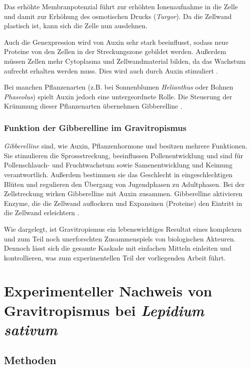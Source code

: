 \documentclass[
a4paper, 
11pt, 
ngerman,
listof=totoc,
bibliography=totocnumbered,
abstracton
]{scrreprt}
\begin{document}
Das erhöhte Membranpotenzial führt zur erhöhten Ionenaufnahme in die Zelle und damit zur Erhöhung des osmotischen Drucks (\emph{Turgor}). Da die Zellwand plastisch ist, kann sich die Zelle nun ausdehnen. 

Auch die Genexpression wird von Auxin sehr stark beeinflusst, sodass neue Proteine von den Zellen in der Streckungszone gebildet werden.
Außerdem müssen Zellen mehr Cytoplasma und Zellwandmaterial bilden, da das Wachstum aufrecht erhalten werden muss. Dies wird auch durch Auxin stimuliert \parencite[1118ff]{campbell}.

Bei manchen Pflanzenarten (z.B. bei Sonnenblumen \emph{Helianthus} oder Bohnen \emph{Phaseolus}) spielt Auxin jedoch eine untergeordnete Rolle.
Die Steuerung der Krümmung dieser Pflanzenarten übernehmen Gibberelline \parencite[502f]{Nultsch}.
 
\subsection{Funktion der Gibberelline im Gravitropismus}

\emph{Gibberelline} sind, wie Auxin, Pflanzenhormone und besitzen mehrere Funktionen. 
Sie stimulieren die Sprossstreckung, beeinflussen Pollenentwicklung und sind für Pollenschlauch- und Fruchtwachstum sowie Samenentwicklung und Keimung verantwortlich. Außerdem bestimmen sie das Geschlecht in eingeschlechtigen Blüten und regulieren den Übergang von Jugendphasen zu Adultphasen. 
Bei der Zellstreckung wirken Gibberelline mit Auxin zusammen. Gibberelline aktivieren Enzyme, die die Zellwand auflockern und Expansinen (Proteine) den Eintritt in die Zellwand erleichtern \parencite[1122f]{campbell}.

 
Wie dargelegt, ist Gravitropismus ein lebenswichtiges Resultat eines komplexen und zum Teil noch unerforschten Zusammenspiels von biologischen Akteuren. Dennoch lässt sich die gesamte Kaskade mit einfachen Mitteln einleiten und kontrollieren, was zum experimentellen Teil der vorliegenden Arbeit führt. 



\chapter{Experimenteller Nachweis von Gravitropismus bei \emph{Lepidium sativum}}

\section{Methoden}
\end{document}
